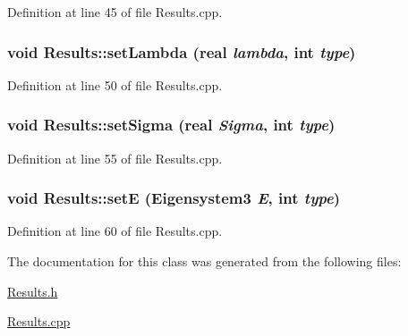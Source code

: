 Definition at line 45 of file Results.cpp.\hypertarget{classResults_5f0e53eed7fbf0b2e9863a04eebce630}{
\subsubsection[setLambda]{\setlength{\rightskip}{0pt plus 5cm}void Results::setLambda ({\bf real} {\em lambda}, \/  int {\em type})}}
\label{classResults_5f0e53eed7fbf0b2e9863a04eebce630}




Definition at line 50 of file Results.cpp.\hypertarget{classResults_9bafe25181646a2b141504ba32c8596f}{
\subsubsection[setSigma]{\setlength{\rightskip}{0pt plus 5cm}void Results::setSigma ({\bf real} {\em Sigma}, \/  int {\em type})}}
\label{classResults_9bafe25181646a2b141504ba32c8596f}




Definition at line 55 of file Results.cpp.\hypertarget{classResults_69d3ed203d7eda44c0fcc06d4ea88257}{
\subsubsection[setE]{\setlength{\rightskip}{0pt plus 5cm}void Results::setE ({\bf Eigensystem3} {\em E}, \/  int {\em type})}}
\label{classResults_69d3ed203d7eda44c0fcc06d4ea88257}




Definition at line 60 of file Results.cpp.

The documentation for this class was generated from the following files:\begin{CompactItemize}
\item 
\hyperlink{Results_8h}{Results.h}\item 
\hyperlink{Results_8cpp}{Results.cpp}\end{CompactItemize}
